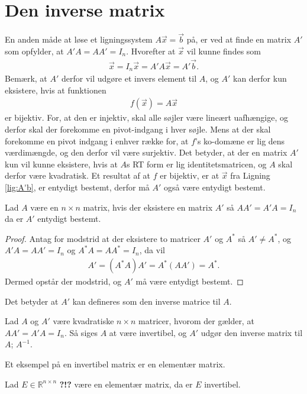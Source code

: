 \section{Den inverse matrix}
En anden måde at løse et ligningssystem $A\vec{x} = \vec{b}$ på, er ved at finde en matrix $A'$ som opfylder, at $A'A =A A' = I_n$.
Hvorefter at $\vec{x}$ vil kunne findes som
\begin{align}
\vec{x}= I_n\vec{x} = A'A\vec{x} = A'\vec{b}.
\label{lig:A'b}
\end{align}
Bemærk, at $A'$ derfor vil udgøre et invers element til $A$, og $A'$ kan derfor kun eksistere, hvis at funktionen
\begin{align*}
f(\vec{x}) = A \vec{x} 
\label{lig:funktion}
\end{align*}
er bijektiv.
For, at den er injektiv, skal alle søjler være lineært uafhængige, og derfor skal der forekomme en pivot-indgang i hver søjle.
Mens at der skal forekomme en pivot indgang i enhver række for, at $f$'s ko-domæne er lig dens værdimængde, og den derfor vil være surjektiv. 
Det betyder, at der en matrix $A'$ kun vil kunne eksistere, hvis at $A$s RT form er lig identitetsmatricen, og $A$ skal derfor være kvadratisk.
Et resultat af at $f$ er bijektiv, er at $\vec{x}$ fra Ligning \eqref{lig:A'b}, er entydigt bestemt, derfor må $A'$ også være entydigt bestemt.
\begin{stn}
Lad $A$ være en $n \times n $ matrix, hvis der eksistere en matrix $A'$ så $AA'= A'A = I_n$ da er $A'$ entydigt bestemt.
\label{stn:endtydiginvers}
\end{stn}
\begin{proof}
Antag for modstrid at der eksistere to matricer $A'$ og $A^*$ så $A' \neq A^*$, og $A'A= AA' = I_n$ og $A^*A = AA^* = I_n$, da vil
\begin{align*}
A' = (A^*A)A' = A^*(AA') = A^*.
\end{align*}
Dermed opstår der modstrid, og $A'$ må være entydigt bestemt.
\end{proof}
Det betyder at $A'$ kan defineres som den inverse matrice til $A$.
\begin{defn}
Lad $A$ og $A'$ være kvadratiske $n \times n$ matricer, hvorom der gælder, at $AA'=A'A=I_n$. 
Så siges $A$ at være invertibel, og $A'$ udgør den inverse matrix til $A$; $A^{-1}$. 
\label{def(inversmatrix)}
\end{defn}
Et eksempel på en invertibel matrix er en elementær matrix.
\begin{lma}
Lad $E \in \mathds{R}^{n\times n}$ \textbf{?!?} være en elementær matrix, da er $E$ invertibel.
\label{lma:Einvertibel}
\end{lma}
